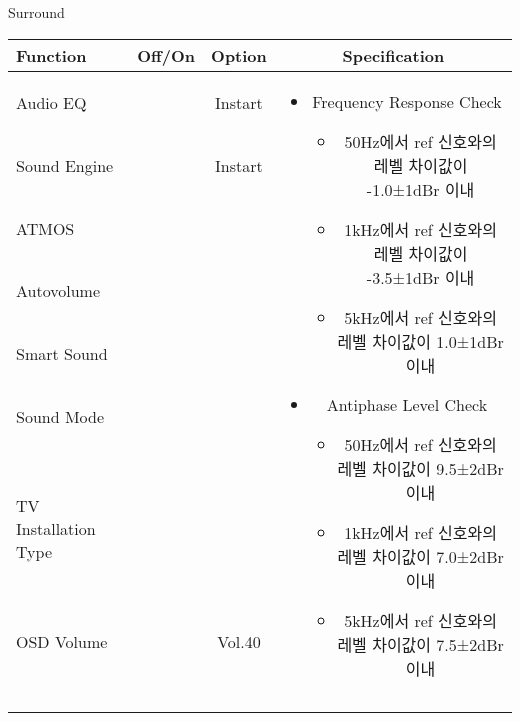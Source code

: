 \begin{frame}[t]{Surround}
\begin{tiny}
\begin{tabular}{@{}lccc@{}}
\toprule
Function & Off/On & Option & Specification \\
\midrule
Audio EQ & \color{black}{Off} & Instart &
\multirow{10}{60mm}{
\begin{itemize}\vspace{-3mm}
\item Frequency Response Check
	\begin{itemize}
		\item 50Hz에서 ref 신호와의 레벨 차이값이 -1.0±1dBr 이내
		\item 1kHz에서 ref 신호와의 레벨 차이값이 -3.5±1dBr 이내
		\item 5kHz에서 ref 신호와의 레벨 차이값이 1.0±1dBr 이내	
	\end{itemize}
\item Antiphase Level Check
	\begin{itemize}
		\item 50Hz에서 ref 신호와의 레벨 차이값이 9.5±2dBr 이내
		\item 1kHz에서 ref 신호와의 레벨 차이값이 7.0±2dBr 이내
		\item 5kHz에서 ref 신호와의 레벨 차이값이 7.5±2dBr 이내
	\end{itemize}
\end{itemize}
} \\
Sound Engine & \color{blue}{On} & Instart & \\
ATMOS & \color{black}{Off}  & & \\
Autovolume & \color{black}{Off} & & \\
Smart Sound & \color{black}{Off} & & \\
Sound Mode & \color{blue}{On} & \color{blue}{Surround} & \\
TV Installation Type & \color{blue}{On} & \color{black}{Standtype1} & \\
OSD Volume & \color{blue}{On} & Vol.40 & \\
& & & \\
& & & \\
& & & \\
& & & \\
\midrule
\end{tabular}
\end{tiny}


\end{frame}
